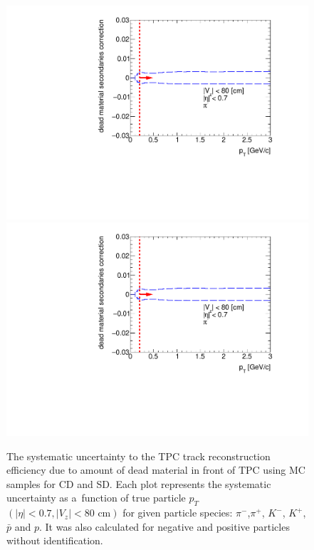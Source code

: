 \begin{figure}[hb]
\caption[The systematic uncertainty to the TPC track reconstruction efficiency due to  amount of dead material in front of TPC using MC samples for CD and SD]{The systematic uncertainty to the TPC track reconstruction efficiency due to  amount of dead material in front of TPC using MC samples for CD and SD. Each plot represents the systematic uncertainty as a~function of true particle $p_T$ $\left(|\eta|<0.7, |V_{z}|<80 \text{ cm}\right)$ for given particle species: $\pi^-$,$\pi^+$, $K^-$, $K^+$, $\bar{p}$ and $p$. It was also calculated for negative and positive particles without identification. }\label{fig:dead_materialCDSD1D}
\centering
\parbox{0.495\textwidth}{
  \centering
  \includegraphics[width=\linewidth,page=1]{graphics/systematicsEfficiency/deadMaterial/secondaries_Unbinned_SDCD_1D.pdf}\\
  \includegraphics[width=\linewidth,page=2]{graphics/systematicsEfficiency/deadMaterial/secondaries_Unbinned_SDCD_1D.pdf}\\
}
\end{figure}
